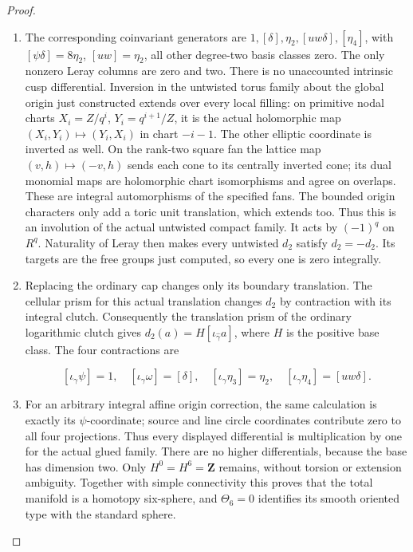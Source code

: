 \begin{proof}
\begin{enumerate}[label=\arabic*.]
\item The corresponding coinvariant generators are
\(1,[\delta],\eta_2,[uw\delta],[\eta_4]\), with
\([\psi\delta]=8\eta_2\), \([uw]=\eta_2\), all other
degree-two basis classes zero.  The only nonzero Leray columns
are zero and two.  There is no unaccounted intrinsic cusp
differential.  Inversion in the untwisted torus family about the
global origin just constructed extends over every local filling:
on primitive nodal charts
\(X_i=Z/q^i\), \(Y_i=q^{i+1}/Z\), it is the actual holomorphic
map \((X_i,Y_i)\mapsto(Y_i,X_i)\) in chart \(-i-1\).
The other elliptic coordinate is inverted as well.  On the
rank-two square fan the lattice map \((v,h)\mapsto(-v,h)\)
sends each cone to its centrally inverted cone; its dual monomial
maps are holomorphic chart isomorphisms and agree on overlaps.
These are integral automorphisms of the specified fans.
The bounded origin characters only add a toric unit translation,
which extends too.  Thus this is an involution of the actual
untwisted compact family.  It acts by \((-1)^q\) on \(R^q\).
Naturality of Leray then makes every untwisted \(d_2\) satisfy
\(d_2=-d_2\).  Its targets are the free groups just computed,
so every one is zero integrally.

\item Replacing the ordinary cap changes only its boundary translation.
The cellular prism for this actual translation changes \(d_2\)
by contraction with its integral clutch.  Consequently the
translation prism of the ordinary
logarithmic clutch gives
\(d_2(a)=H[\iota_{\widehat\gamma}a]\), where \(H\) is the
positive base class.  The four contractions are

\[
 [\iota_\gamma\psi]=1,\quad
 [\iota_\gamma\omega]=[\delta],\quad
 [\iota_\gamma\eta_3]=\eta_2,\quad
 [\iota_\gamma\eta_4]=[uw\delta].
\]

\item For an arbitrary integral affine origin correction, the same
calculation is exactly its \(\psi\)-coordinate; source and line
circle coordinates contribute zero to all four projections.
Thus every displayed differential is multiplication by one for
the actual glued family.  There are no higher differentials,
because the base has dimension two.  Only
\(H^0=H^6=\mathbf Z\) remains, without torsion or extension
ambiguity.  Together with simple connectivity this proves that
the total manifold is a homotopy six-sphere, and \(\Theta_6=0\)
identifies its smooth oriented type with the standard sphere.


\end{enumerate}
\end{proof}
